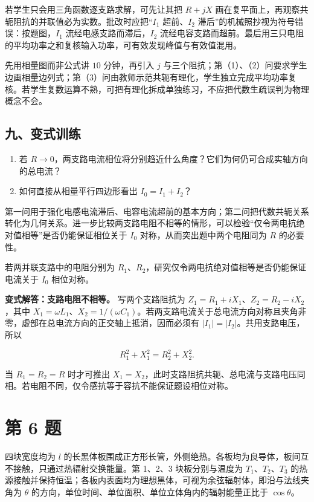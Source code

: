 \documentclass[12pt,a4paper,UTF8]{ctexart}
\newcommand{\tightlist}{\setlength{\itemsep}{0pt}\setlength{\parskip}{0pt}}
\begin{document}
若学生只会用三角函数逐支路求解，可先让其把 \(R+jX\)
画在复平面上，再观察共轭阻抗的并联值必为实数。批改时应把``\(I_1\)
超前、\(I_2\) 滞后''的机械照抄视为符号错误：按题图，\(I_1\)
流经电感支路而滞后，\(I_2\)
流经电容支路而超前。最后用三只电阻的平均功率之和复核输入功率，可有效发现峰值与有效值混用。

先用相量图而非公式讲 \(10\) 分钟，再引入 \(j\)
与三个阻抗；第（1）、（2）问要求学生边画相量边列式；第（3）问由教师示范共轭有理化，学生独立完成平均功率复核。若学生复数运算不熟，可把有理化拆成单独练习，不应把代数生疏误判为物理概念不会。

\subsection{九、变式训练}\label{ux4e5dux53d8ux5f0fux8badux7ec3-4}

\begin{enumerate}
\def\labelenumi{\arabic{enumi}.}
\tightlist
\item
  若
  \(R\to0\)，两支路电流相位将分别趋近什么角度？它们为何仍可合成实轴方向的总电流？
\item
  如何直接从相量平行四边形看出 \(I_0=I_1+I_2\)？
\end{enumerate}

第一问用于强化电感电流滞后、电容电流超前的基本方向；第二问把代数共轭关系转化为几何关系。进一步比较两支路电阻不相等的情形，可以检验``仅令两电抗绝对值相等''是否仍能保证相位关于
\(I_0\) 对称，从而突出题中两个电阻同为 \(R\) 的必要性。

若两并联支路中的电阻分别为
\(R_1\)、\(R_2\)，研究仅令两电抗绝对值相等是否仍能保证电流关于 \(I_0\)
相位对称。

\textbf{变式解答：支路电阻不相等。} 写两个支路阻抗为
\(Z_1=R_1+iX_1\)、\(Z_2=R_2-iX_2\)，其中
\(X_1=\omega L_1\)、\(X_2=1/(\omega C_1)\)。若两支路电流关于总电流方向对称且夹角非零，虚部在总电流方向的正交轴上抵消，因而必须有
\(|I_1|=|I_2|\)。共用支路电压，所以

\[R_1^2+X_1^2=R_2^2+X_2^2.\]

当 \(R_1=R_2=R\) 时才可推出
\(X_1=X_2\)，此时支路阻抗共轭、总电流与支路电压同相。若电阻不同，仅令感抗等于容抗不能保证题设相位对称。

\newpage

\section{第 6 题}\label{ux7b2c-6-ux9898}

四块宽度均为 \(l\)
的长黑体板围成正方形长管，外侧绝热。各板均为良导体，板间互不接触，只通过热辐射交换能量。第
1、2、3 块板分别与温度为 \(T_1\)、\(T_2\)、\(T_3\)
的热源接触并保持恒温；各板内表面均为理想黑体，可视为余弦辐射体，即沿与法线夹角为
\(\theta\) 的方向，单位时间、单位面积、单位立体角内的辐射能量正比于
\(\cos\theta\)。
\end{document}
